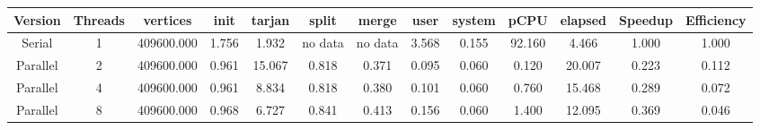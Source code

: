 \begin{tabular}{|c|c|c|c|c|c|c|c|c|c|c|c|c|}
\toprule
 Version &  Threads &   vertices &  init &  tarjan &   split &   merge &  user &  system &   pCPU &  elapsed &  Speedup &  Efficiency \\
\midrule
  Serial &        1 & 409600.000 & 1.756 &   1.932 & no data & no data & 3.568 &   0.155 & 92.160 &    4.466 &    1.000 &       1.000 \\
Parallel &        2 & 409600.000 & 0.961 &  15.067 &   0.818 &   0.371 & 0.095 &   0.060 &  0.120 &   20.007 &    0.223 &       0.112 \\
Parallel &        4 & 409600.000 & 0.961 &   8.834 &   0.818 &   0.380 & 0.101 &   0.060 &  0.760 &   15.468 &    0.289 &       0.072 \\
Parallel &        8 & 409600.000 & 0.968 &   6.727 &   0.841 &   0.413 & 0.156 &   0.060 &  1.400 &   12.095 &    0.369 &       0.046 \\
\bottomrule
\end{tabular}
